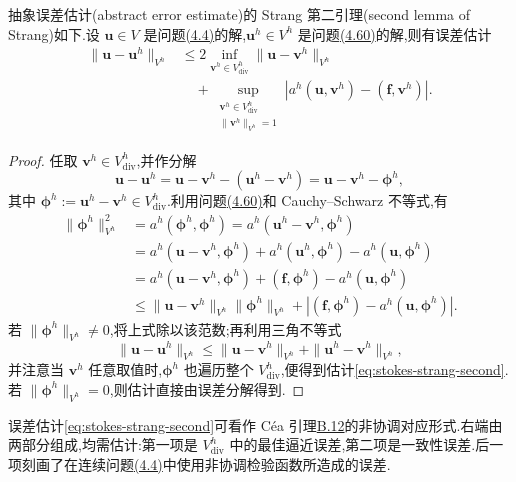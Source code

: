 \begin{lemma}\label{lem:stokes-strang-second}
抽象误差估计(abstract error estimate)的 Strang 第二引理(second lemma of Strang)如下.设 $\bm{u}\in V$ 是问题\hyperref[eq:stokes-weak]{(4.4)}的解,$\bm{u}^h\in V^h$ 是问题\hyperref[eq:stokes-nonconforming-divergence-free-problem]{(4.60)}的解,则有误差估计
\begin{equation}\label{eq:stokes-strang-second}
\begin{aligned}
  \|\bm{u}-\bm{u}^h\|_{V^h}
  &\leq 2\inf_{\bm{v}^h\in V_{\mathrm{div}}^h}
        \|\bm{u}-\bm{v}^h\|_{V^h}\\
  &\quad+
    \sup_{\substack{\bm{v}^h\in V_{\mathrm{div}}^h\\
                     \|\bm{v}^h\|_{V^h}=1}}
    \left|a^h(\bm{u},\bm{v}^h)
          -(\bm{f},\bm{v}^h)\right|.
\end{aligned}
\end{equation}
\end{lemma}
\begin{proof}
任取 $\bm{v}^h\in V_{\mathrm{div}}^h$,并作分解
\[
  \bm{u}-\bm{u}^h
  =\bm{u}-\bm{v}^h-(\bm{u}^h-\bm{v}^h)
  =\bm{u}-\bm{v}^h-\symbf{\phi}^h,
\]
其中 $\symbf{\phi}^h:=\bm{u}^h-\bm{v}^h\in V_{\mathrm{div}}^h$.利用问题\hyperref[eq:stokes-nonconforming-divergence-free-problem]{(4.60)}和 Cauchy--Schwarz 不等式,有
\[
\begin{aligned}
  \|\symbf{\phi}^h\|_{V^h}^2
  &=a^h(\symbf{\phi}^h,\symbf{\phi}^h)
    =a^h(\bm{u}^h-\bm{v}^h,\symbf{\phi}^h)\\
  &=a^h(\bm{u}-\bm{v}^h,\symbf{\phi}^h)
    +a^h(\bm{u}^h,\symbf{\phi}^h)
    -a^h(\bm{u},\symbf{\phi}^h)\\
  &=a^h(\bm{u}-\bm{v}^h,\symbf{\phi}^h)
    +(\bm{f},\symbf{\phi}^h)
    -a^h(\bm{u},\symbf{\phi}^h)\\
  &\leq\|\bm{u}-\bm{v}^h\|_{V^h}
        \|\symbf{\phi}^h\|_{V^h}
    +\left|(\bm{f},\symbf{\phi}^h)
            -a^h(\bm{u},\symbf{\phi}^h)\right|.
\end{aligned}
\]
若 $\|\symbf{\phi}^h\|_{V^h}\ne0$,将上式除以该范数;再利用三角不等式
\[
  \|\bm{u}-\bm{u}^h\|_{V^h}
  \leq\|\bm{u}-\bm{v}^h\|_{V^h}
      +\|\bm{u}^h-\bm{v}^h\|_{V^h},
\]
并注意当 $\bm{v}^h$ 任意取值时,$\symbf{\phi}^h$ 也遍历整个 $V_{\mathrm{div}}^h$,便得到估计\cref{eq:stokes-strang-second}.若 $\|\symbf{\phi}^h\|_{V^h}=0$,则估计直接由误差分解得到.
\end{proof}

\begin{note}\label{note:stokes-strang-second}
误差估计\cref{eq:stokes-strang-second}可看作 Céa 引理\hyperref[lem:cea]{B.12}的非协调对应形式.右端由两部分组成,均需估计:第一项是 $V_{\mathrm{div}}^h$ 中的最佳逼近误差,第二项是一致性误差.后一项刻画了在连续问题\hyperref[eq:stokes-weak]{(4.4)}中使用非协调检验函数所造成的误差.
\end{note}

